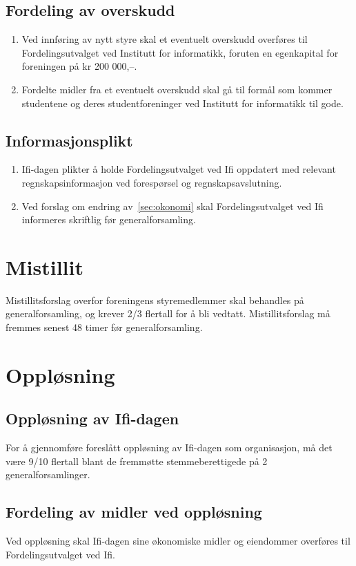 \documentclass[norsk,a4paper]{article}
\begin{document}
\subsection{Fordeling av overskudd}
\begin{enumerate}
    \item{Ved innføring av nytt styre skal et eventuelt overskudd overføres til Fordelingsutvalget ved Institutt for informatikk, foruten en egenkapital for foreningen på kr 200 000,--.}
    \item{Fordelte midler fra et eventuelt overskudd skal gå til formål som kommer studentene og deres studentforeninger ved Institutt for informatikk til gode.}
\end{enumerate}
\subsection{Informasjonsplikt}
\begin{enumerate}
    \item{Ifi-dagen plikter å holde Fordelingsutvalget ved Ifi oppdatert med relevant regnskapsinformasjon ved forespørsel og regnskapsavslutning.}
    \item{Ved forslag om endring av~\ref{sec:okonomi} skal Fordelingsutvalget ved Ifi informeres skriftlig før generalforsamling.}
\end{enumerate}

\section{Mistillit}
Mistillitsforslag overfor foreningens styremedlemmer skal behandles på generalforsamling, og krever 2/3 flertall for å bli vedtatt. Mistillitsforslag må fremmes senest 48 timer før generalforsamling.

\section{Oppløsning}
\subsection{Oppløsning av Ifi-dagen}
        For å gjennomføre foreslått oppløsning av Ifi-dagen som organisasjon, må det være 9/10 flertall
        blant de fremmøtte stemmeberettigede på 2 generalforsamlinger.
\subsection{Fordeling av midler ved oppløsning}
        Ved oppløsning skal Ifi-dagen sine økonomiske midler og eiendommer overføres til
        Fordelingsutvalget ved Ifi.
\end{document}
